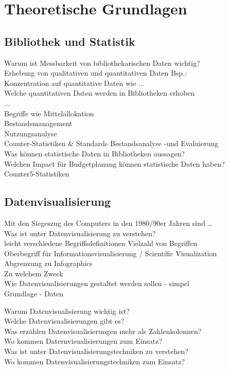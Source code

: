 \chapter{Theoretische Grundlagen}
\label{chap:two}
\section{Bibliothek und Statistik}
\label{chap:two_one}
Warum ist Messbarkeit von bibliothekarischen Daten wichtig?\\
Erhebung von qualitativen und quantitativen Daten Bsp.:\\

Konzentration auf quantitative Daten wie ...\\
Welche quantitativen Daten werden in Bibliotheken erhoben\\
...\\
Begriffe wie Mittelallokation\\
Bestandsmanagement\\
Nutzungsanalyse\\
Counter-Statistiken \& Standards
Bestandsanalyse -und Evaluierung\\
Was können statistische Daten in Bibliotheken aussagen?\\
Welchen Impact für Budgetplanung können statistische Daten haben?\\
Counter5-Statistiken


\section{Datenvisualisierung}
Mit den Siegeszug des Computers in den 1980/90er Jahren sind \dots\\



Was ist unter Datenvisualisierung zu verstehen?\\
leicht verschiedene Begriffsdefinitionen
Vielzahl von Begriffen\\ Oberbegriff für Informationsvisualisierung / Scientific Visualization\\
Abgrenzung zu Infographics\\
Zu welchem Zweck\\
Wie Datenvisualisierungen gestaltet werden sollen - simpel\\
Grundlage - Daten 

Warum Datenvisualisierung wichtig ist?\\
Welche Datenvisualisierungen gibt es?\\
Was erzählen Datenvisualisierungen mehr als Zahlenkolonnen?\\
Wo kommen Daternvisualisierungen zum Einsatz?\\
Was ist unter Datenvisualisierungstechniken zu verstehen?\\
Wo kommen Datenvisualisierungstechniken zum Einsatz?


